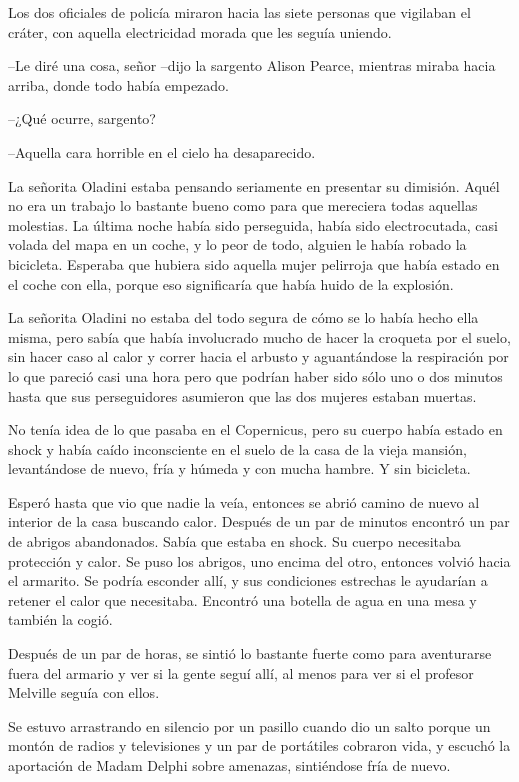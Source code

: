 Los dos oficiales de policía miraron hacia las siete personas que
vigilaban el cráter, con aquella electricidad morada que les seguía
uniendo.

--Le diré una cosa, señor --dijo la sargento Alison Pearce, mientras
miraba hacia arriba, donde todo había empezado.

--¿Qué ocurre, sargento?

--Aquella cara horrible en el cielo ha desaparecido.

La señorita Oladini estaba pensando seriamente en presentar su dimisión.
Aquél no era un trabajo lo bastante bueno como para que mereciera todas
aquellas molestias. La última noche había sido perseguida, había sido
electrocutada, casi volada del mapa en un coche, y lo peor de todo,
alguien le había robado la bicicleta. Esperaba que hubiera sido aquella
mujer pelirroja que había estado en el coche con ella, porque eso
significaría que había huido de la explosión.

La señorita Oladini no estaba del todo segura de cómo se lo había hecho
ella misma, pero sabía que había involucrado mucho de hacer la croqueta
por el suelo, sin hacer caso al calor y correr hacia el arbusto y
aguantándose la respiración por lo que pareció casi una hora pero que
podrían haber sido sólo uno o dos minutos hasta que sus perseguidores
asumieron que las dos mujeres estaban muertas.

No tenía idea de lo que pasaba en el Copernicus, pero su cuerpo había
estado en shock y había caído inconsciente en el suelo de la casa de la
vieja mansión, levantándose de nuevo, fría y húmeda y con mucha hambre.
Y sin bicicleta.

Esperó hasta que vio que nadie la veía, entonces se abrió camino de
nuevo al interior de la casa buscando calor. Después de un par de
minutos encontró un par de abrigos abandonados. Sabía que estaba en
shock. Su cuerpo necesitaba protección y calor. Se puso los abrigos, uno
encima del otro, entonces volvió hacia el armarito. Se podría esconder
allí, y sus condiciones estrechas le ayudarían a retener el calor que
necesitaba. Encontró una botella de agua en una mesa y también la cogió.

Después de un par de horas, se sintió lo bastante fuerte como para
aventurarse fuera del armario y ver si la gente seguí allí, al menos
para ver si el profesor Melville seguía con ellos.

Se estuvo arrastrando en silencio por un pasillo cuando dio un salto
porque un montón de radios y televisiones y un par de portátiles
cobraron vida, y escuchó la aportación de Madam Delphi sobre amenazas,
sintiéndose fría de nuevo.

